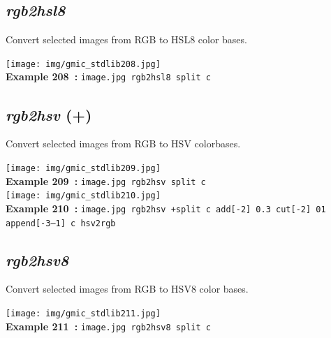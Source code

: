 \documentclass[a4paper,10.5pt,twoside]{book}
\def\comma{\discretionary{,}{}{,}}
\begin{document}
\subsection{\emph{rgb2hsl8} }\vspace*{-0.7em}
Convert selected images from RGB to HSL8 color bases.
\begin{center}\texttt{[image: img/gmic\_stdlib208.jpg]}\\
{\footnotesize \textbf{Example 208~:} \texttt{image.jpg rgb2hsl8 split c}}
\end{center}

\subsection{\emph{rgb2hsv} (+)}\vspace*{-0.7em}
Convert selected images from RGB to HSV colorbases.
\begin{center}\texttt{[image: img/gmic\_stdlib209.jpg]}\\
{\footnotesize \textbf{Example 209~:} \texttt{image.jpg rgb2hsv split c}}
\\\texttt{[image: img/gmic\_stdlib210.jpg]}\\
{\footnotesize \textbf{Example 210~:} \texttt{image.jpg rgb2hsv +split c add[-2] 0.3 cut[-2] 0{\comma}1 append[-3--1] c hsv2rgb}}
\end{center}

\subsection{\emph{rgb2hsv8} }\vspace*{-0.7em}
Convert selected images from RGB to HSV8 color bases.
\begin{center}\texttt{[image: img/gmic\_stdlib211.jpg]}\\
{\footnotesize \textbf{Example 211~:} \texttt{image.jpg rgb2hsv8 split c}}
\end{center}
\end{document}
